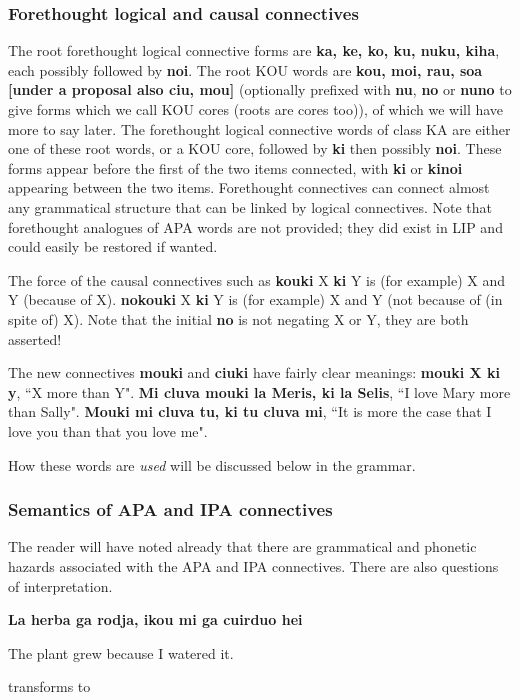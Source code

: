 \documentclass[12pt]{book}
\begin{document}
{\subsubsection{Forethought logical and causal connectives}

The root forethought logical connective forms are {\bf ka, ke, ko, ku, nuku, kiha}, each  possibly followed by {\bf noi}.   The root KOU words are {\bf kou, moi, rau, soa [under a proposal also ciu, mou]} (optionally prefixed with {\bf nu}, {\bf no} or {\bf nuno} to give forms which we call KOU cores (roots are cores too)), of which we will have more to say later.
The forethought logical connective words of class KA are either one of these root words, or a KOU core, followed by {\bf ki} then possibly {\bf noi}.   These forms appear before the first of the two items connected, with {\bf ki} or {\bf kinoi} appearing between the two items.   Forethought connectives can connect almost any grammatical structure that can be linked by logical connectives.   Note that forethought analogues of APA words are not provided; they did exist in LIP and could easily be restored if wanted.

The force of the causal connectives such as {\bf kouki} X {\bf ki} Y is (for example)  X and Y (because of X).   {\bf nokouki} X {\bf ki} Y is (for example)  X and Y (not because of (in spite of) X).  Note
that the initial {\bf no} is not negating X or Y, they are both asserted!  

The new connectives {\bf mouki} and {\bf ciuki}  have fairly clear meanings:  {\bf mouki X ki y}, ``X more than Y".  {\bf Mi cluva mouki la Meris, ki la Selis}, ``I love Mary more than Sally".  {\bf Mouki mi cluva tu, ki tu cluva mi}, ``It is more the case that I love you than that you love me".

How these words are {\em used\/} will be discussed below in the grammar.

\subsubsection{Semantics of APA and IPA connectives}

The reader will have noted already that there are grammatical and phonetic hazards associated with the APA and IPA connectives.  There are also questions of interpretation.

{\bf La herba ga rodja, ikou mi ga cuirduo hei}

The plant grew because I watered it.

transforms to

}
\end{document}
